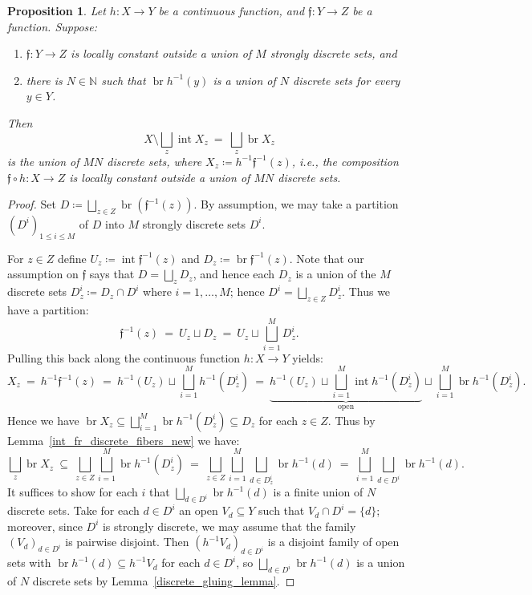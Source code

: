 \documentclass[11pt]{amsart}
\theoremstyle{plain}
\newtheorem{prop}[thm]{Proposition}
\theoremstyle{definition}
\numberwithin{equation}{section}
\newcommand{\fr}{\mathfrak}
\newcommand\N{\mathbb{N}}
\newcommand\0{\varnothing}
\begin{document}
\begin{prop}\label{key_discreteness_prop2_new}
Let $h\colon X\to Y$ be a continuous function, and $\fr{f}\colon Y\to Z$ be a function. Suppose:
\begin{enumerate}
\item $\fr{f}\colon Y\to Z$ is locally constant outside a union of $M$ strongly discrete sets, and 
\item there is $N \in \N$ such that $\operatorname{br}h^{-1}(y)$ is a union of $N$ discrete sets for every $y\in Y$.
\end{enumerate}
Then
\[
\textstyle X\setminus\bigsqcup_z\operatorname{int}X_z \ = \ \bigsqcup_z\operatorname{br}X_z 
\]
is the union of $MN$ discrete sets, where $X_z\coloneqq h^{-1}\fr{f}^{-1}(z)$, i.e., the composition $\fr{f}\circ h\colon X\to Z$ is locally constant outside a union of $MN$ discrete sets.
\end{prop}
\begin{proof}
Set $D\coloneqq\bigsqcup_{z\in Z}\operatorname{br}(\fr{f}^{-1}(z))$. By assumption, we may take a partition $(D^i)_{1\leq i\leq M}$ of $D$ into $M$ strongly discrete sets $D^i$.

For $z\in Z$ define $U_z\coloneqq\operatorname{int}\fr{f}^{-1}(z)$ and $D_z\coloneqq\operatorname{br}\fr{f}^{-1}(z)$. Note that our assumption on $\fr{f}$ says that $D=\bigsqcup_{z}D_z$, and hence each $D_z$ is a union of the $M$ discrete sets $D_z^i\coloneqq D_z\cap D^i$ where $i=1,\ldots,M$; hence $D^i=\bigsqcup_{z\in Z}D^i_z$. Thus we have a partition:
\[
\textstyle \fr{f}^{-1}(z) \ = \ U_z\sqcup D_z \ = \ U_z\sqcup\bigsqcup_{i=1}^MD_z^i.
\]
Pulling this back along the continuous function $h\colon X\to Y$ yields:
\[
\textstyle X_z \ = \ h^{-1}\fr{f}^{-1}(z) \ = \ h^{-1}(U_z)\sqcup\bigsqcup_{i=1}^Mh^{-1}(D_z^i) \ = \ \underbrace{\textstyle h^{-1}(U_z)\sqcup\bigsqcup_{i=1}^M\operatorname{int} h^{-1}(D_z^i)}_{\text{open}}\sqcup\bigsqcup_{i=1}^M\operatorname{br}h^{-1}(D_z^i).
\]
Hence we have $\operatorname{br}X_z\subseteq \bigsqcup_{i=1}^M\operatorname{br}h^{-1}(D^i_z)\subseteq D_z$ for each $z\in Z$. Thus by Lemma~\ref{int_fr_discrete_fibers_new} we have:
\[
\textstyle \bigsqcup_z\operatorname{br}X_z \ \subseteq \ \bigsqcup_{z\in Z}\bigsqcup_{i=1}^M\operatorname{br}h^{-1}(D^i_z) \ = \ \bigsqcup_{z\in Z}\bigsqcup_{i=1}^M\bigsqcup_{d\in D^i_z}\operatorname{br}h^{-1}(d) \ = \ \bigsqcup_{i=1}^M\bigsqcup_{d\in D^i}\operatorname{br}h^{-1}(d).
\]
It suffices to show for each $i$ that $\bigsqcup_{d\in D^i}\operatorname{br}h^{-1}(d)$ is a finite union of $N$ discrete sets. Take for each $d\in D^i$ an open $V_d\subseteq Y$ such that $V_d\cap D^i=\{d\}$; moreover, since $D^i$ is strongly discrete, we may assume that the family $(V_d)_{d\in D^i}$ is pairwise disjoint. Then $(h^{-1}V_d)_{d\in D^i}$ is a disjoint family of open sets with $\operatorname{br}h^{-1}(d)\subseteq h^{-1}V_d$ for each $d\in D^i$, so $\bigsqcup_{d\in D^i}\operatorname{br}h^{-1}(d)$ is a union of $N$ discrete sets by Lemma~\ref{discrete_gluing_lemma}.
\end{proof}
\end{document}
